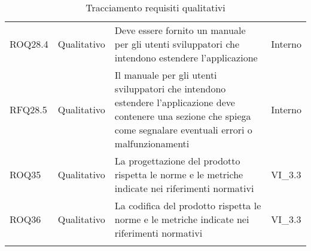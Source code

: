 \begin{longtable}{p{2cm}!{\VRule[1pt]}p{2cm}!{\VRule[1pt]}p{5cm}!{\VRule[1pt]}p{1.5cm}}
ROQ28.4&Qualitativo\newline  & Deve essere fornito un manuale per gli utenti sviluppatori che intendono estendere l’applicazione & Interno \\
RFQ28.5&Qualitativo\newline  & Il manuale per gli utenti sviluppatori che intendono estendere l’applicazione deve contenere una sezione che spiega come segnalare eventuali errori o malfunzionamenti & Interno \\
ROQ35&Qualitativo\newline  & La progettazione del prodotto rispetta le norme e le metriche indicate nei riferimenti normativi & VI_3.3 \\
ROQ36&Qualitativo\newline  & La codifica del prodotto rispetta le norme e le metriche indicate nei riferimenti normativi & VI_3.3 \\
\caption{Tracciamento requisiti qualitativi}
\end{longtable}
